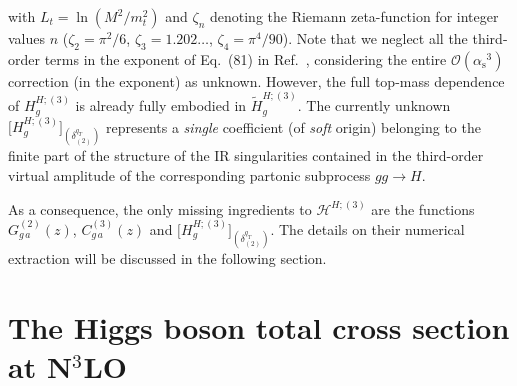 \documentclass[12pt]{article}
\DeclareRobustCommand{\alphas}{\ensuremath{\alpha_{\mathrm{s}}}\xspace}
\DeclareRobustCommand{\as}{\alphas}
\DeclareRobustCommand{\qt}{\ensuremath{q_T}\xspace}
\DeclareRobustCommand{\cH}{\ensuremath{\mathcal{H}}}
\begin{document}
with $L_t=\ln(M^2/m_t^2)$ and $\zeta_n$ denoting the Riemann zeta-function for integer values $n$ ($\zeta_2=\pi^2/6$, $\zeta_3=1.202\dots$, $\zeta_4=\pi^4/90$).
Note that we neglect all the third-order terms in the exponent of Eq.~(81) in Ref.~\cite{Catani:2013tia}, considering the entire $\mathcal{O}(\as^{3})$ correction (in the exponent) as unknown. However, the full top-mass dependence of $H^{H;(3)}_g$ is already fully embodied in $\widetilde{H}^{H;(3)}_{g}$.
The currently unknown $\big[H^{H;(3)}_{g}\big]_{(\delta^{\qt}_{(2)})}$ represents a \emph{single} coefficient (of \emph{soft} origin) belonging to the finite part of the structure of the IR singularities contained in the third-order virtual amplitude of the corresponding partonic subprocess $gg \to H$. 

As a consequence, the only missing ingredients to $\cH^{H;(3)}$ are the functions $G^{(2)}_{g\,a}(z)$, $C^{(3)}_{g\,a}(z)$ and $ \big[H^{H;(3)}_{g}\big]_{(\delta^{\qt}_{(2)})}$. 
The details on their numerical extraction will be discussed in the following section.


\section{The Higgs boson total cross section at \texorpdfstring{N${}^\text{3}$LO}{N3LO}}
\label{sec:numforCN3}
\end{document}
